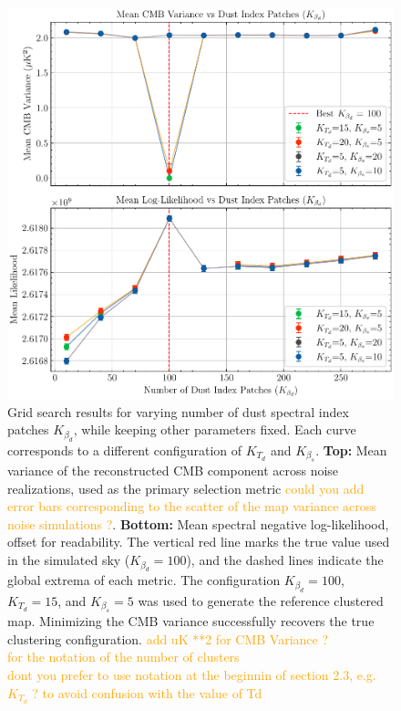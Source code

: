 \documentclass[fleqn,usenatbib]{mnras}
\newcommand{\je}[1]{\textcolor{orange}{#1}}
\begin{document}
\begin{figure}
    \centering
    \includegraphics[width=\linewidth]{figures/validation_likelihood_vs_variance.pdf}
    \caption{
    Grid search results for varying number of dust spectral index patches \( K_{\beta_d} \), while keeping other parameters fixed.
    Each curve corresponds to a different configuration of \( K_{T_d} \) and \( K_{\beta_s} \).
    \textbf{Top:} Mean variance of the reconstructed CMB component across noise realizations, used as the primary selection metric \je{could you add error bars corresponding to the scatter of the map variance across noise simulations ?}.
    \textbf{Bottom:} Mean spectral negative log-likelihood, offset for readability.
    The vertical red line marks the true value used in the simulated sky (\( K_{\beta_d} = 100 \)), and the dashed lines indicate the global extrema of each metric.
    The configuration \( K_{\beta_d} = 100 \), \( K_{T_d} = 15 \), and \( K_{\beta_s} = 5 \) was used to generate the reference clustered map.
    Minimizing the CMB variance successfully recovers the true clustering configuration.
    \je{add uK **2 for CMB Variance ?}\\
    \je{for the notation of the number of clusters}\\
    \je{dont you prefer to use notation at the beginnin of section 2.3, e.g. $K_{T_d}$ ? to avoid confusion with the value of Td}
    }

    \label{fig:grid_search_summary}
\end{figure}
\end{document}
